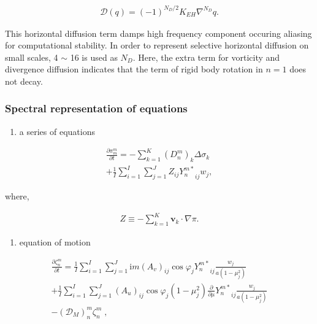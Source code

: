 \begin{eqnarray}
    {\mathcal D}(q) = (-1)^{N_D/2} K_{EH} \nabla^{N_D} q .
\end{eqnarray}

This horizontal diffusion term damps high frequency component occuring
aliasing for computational stability. In order to represent selective
horizontal diffusion on small scales, 4 \(\sim\) 16 is used as \(N_D\).
Here, the extra term for vorticity and divergence diffusion indicates
that the term of rigid body rotation in \(n=1\) does not decay.

\hypertarget{spectral-representation-of-equations}{%
\subsubsection{Spectral representation of
equations}\label{spectral-representation-of-equations}}

\begin{enumerate}
\def\labelenumi{\arabic{enumi}.}
\tightlist
\item
  a series of equations
\end{enumerate}

\begin{eqnarray}
  \frac{\partial{\pi_m^m}}{\partial {t}}
  =  - \sum_{k=1}^{K} (D_n^m)_k \Delta  \sigma_k  \\
     + \frac{1}{I} \sum_{i=1}^{I} \sum_{j=1}^{J}  
               Z_{ij} {Y_n^{m *}}_{ij} w_j  ,
\end{eqnarray}

where,

\begin{eqnarray}
Z \equiv - \sum_{k=1}^{K} \mathbf{v}_k \cdot \nabla \pi .
\end{eqnarray}

\begin{enumerate}
\def\labelenumi{\arabic{enumi}.}
\setcounter{enumi}{1}
\tightlist
\item
  equation of motion
\end{enumerate}

\begin{eqnarray}
  \frac{\partial{\zeta_n^m}}{\partial {t}}
    =  \frac{1}{I} \sum_{i=1}^{I} \sum_{j=1}^{J}  
          \mathrm{i}m (A_v)_{ij} \cos\varphi_j
          {Y_n^{m *}}_{ij}
         \frac{w_j}{a(1-\mu_j^{2})}
         \\
    +    \frac{1}{I} \sum_{i=1}^{I} \sum_{j=1}^{J}  
          (A_u)_{ij} \cos\varphi_j
          (1-\mu_j^2)
          \frac{\partial }{\partial \mu} {Y_n^{m *}}_{ij}
          \frac{w_j}{a(1-\mu_j^{2})}
          \\
    -   ({\mathcal D}_M)_n^m \zeta_n^m  \; ,
\end{eqnarray}

